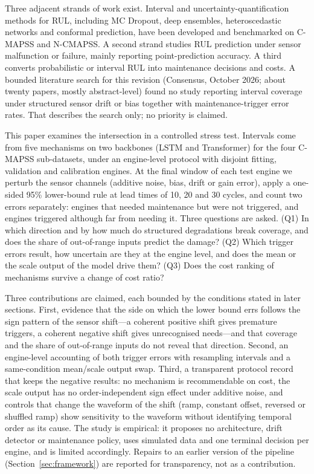 \documentclass[11pt,a4paper]{article}
\begin{document}
Three adjacent strands of work exist. Interval and uncertainty-quantification methods for RUL, including MC Dropout, deep ensembles, heteroscedastic networks and conformal prediction, have been developed and benchmarked on C-MAPSS and N-CMAPSS.\cite{peng2019,basora2025,zhan2024,piao2025,mao2024,xu2021,xu2026} A second strand studies RUL prediction under sensor malfunction or failure, mainly reporting point-prediction accuracy.\cite{xu2023,tang2026,hachem2024} A third converts probabilistic or interval RUL into maintenance decisions and costs.\cite{kim2020,lee2022,zhu2025} A bounded literature search for this revision (Consensus, October 2026; about twenty papers, mostly abstract-level) found no study reporting interval coverage under structured sensor drift or bias together with maintenance-trigger error rates. That describes the search only; no priority is claimed.

This paper examines the intersection in a controlled stress test. Intervals come from five mechanisms on two backbones (LSTM and Transformer) for the four C-MAPSS sub-datasets, under an engine-level protocol with disjoint fitting, validation and calibration engines. At the final window of each test engine we perturb the sensor channels (additive noise, bias, drift or gain error), apply a one-sided 95\% lower-bound rule at lead times of 10, 20 and 30 cycles, and count two errors separately: engines that needed maintenance but were not triggered, and engines triggered although far from needing it. Three questions are asked. (Q1) In which direction and by how much do structured degradations break coverage, and does the share of out-of-range inputs predict the damage? (Q2) Which trigger errors result, how uncertain are they at the engine level, and does the mean or the scale output of the model drive them? (Q3) Does the cost ranking of mechanisms survive a change of cost ratio?

Three contributions are claimed, each bounded by the conditions stated in later sections. First, evidence that the side on which the lower bound errs follows the sign pattern of the sensor shift---a coherent positive shift gives premature triggers, a coherent negative shift gives unrecognised needs---and that coverage and the share of out-of-range inputs do not reveal that direction. Second, an engine-level accounting of both trigger errors with resampling intervals and a same-condition mean/scale output swap. Third, a transparent protocol record that keeps the negative results: no mechanism is recommendable on cost, the scale output has no order-independent sign effect under additive noise, and controls that change the waveform of the shift (ramp, constant offset, reversed or shuffled ramp) show sensitivity to the waveform without identifying temporal order as its cause. The study is empirical: it proposes no architecture, drift detector or maintenance policy, uses simulated data and one terminal decision per engine, and is limited accordingly. Repairs to an earlier version of the pipeline (Section~\ref{sec:framework}) are reported for transparency, not as a contribution.
\end{document}
